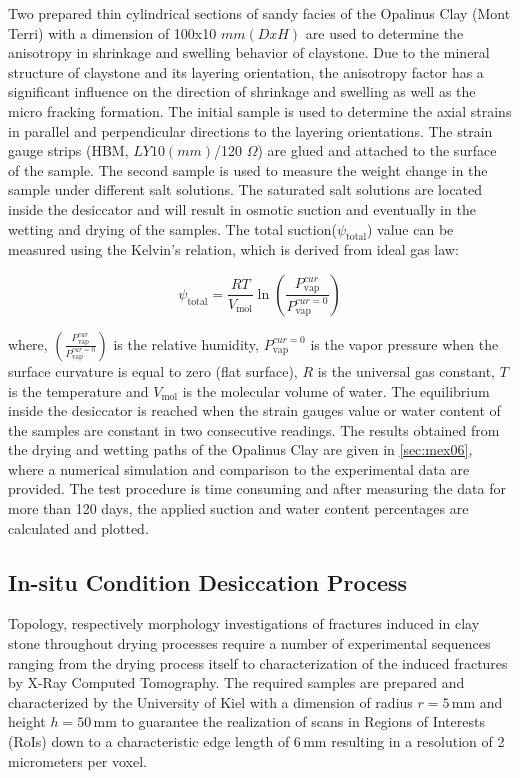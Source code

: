 Two prepared thin cylindrical sections of sandy facies of the Opalinus Clay (Mont Terri) with a dimension of 100x10 $mm (DxH)$ are used to determine the anisotropy in shrinkage and swelling behavior of claystone. Due to the mineral structure of claystone and its layering orientation, the anisotropy factor has a significant influence on the direction of shrinkage and swelling as well as the micro fracking formation. The initial sample is used to determine the axial strains in parallel and perpendicular directions to the layering orientations. The strain gauge strips (HBM, $LY 10 (mm)$/120 $\Omega$) are glued and attached to the surface of the sample. The second sample is used to measure the weight change in the sample under different salt solutions. The saturated salt solutions are located inside the desiccator and will result in osmotic suction and eventually in the wetting and drying of the samples. The total suction($\psi_\text{total}$) value can be measured using the Kelvin’s relation, which is derived from ideal gas law:

\begin{equation}
\label{eq:Total_Suction}
\psi_\text{total} = \frac{RT}{V_\text{mol}} \ln(\frac{P_\text{vap}^{cur}}{P_\text{vap}^{cur=0}})
\end{equation}

where, $(\frac{P_\text{vap}^{cur}}{P_\text{vap}^{cur=0}})$ is the relative humidity, $P_\text{vap}^{cur=0}$ is the vapor pressure when the surface curvature is equal to zero (flat surface), $R$ is the universal gas constant, $T$ is the temperature and $V_\text{mol}$ is the molecular volume of water. The equilibrium inside the desiccator is reached when the strain gauges value or water content of the samples are constant in two consecutive readings. The results obtained from the drying and wetting paths of the Opalinus Clay are given in \ref{sec:mex06}, where a numerical simulation and comparison to the experimental data are provided. The test procedure is time consuming and after measuring the data for more than 120 days, the applied suction and water content percentages are calculated and plotted. 

\subsection{In-situ Condition Desiccation Process}

Topology, respectively morphology investigations of fractures induced in clay stone throughout drying processes require a number of experimental sequences ranging from the drying process itself to characterization of the induced fractures by X-Ray Computed Tomography. The required samples are prepared and characterized by the University of Kiel with a dimension of radius $r=5 \, \text{mm}$ and height $h=50 \, \text{mm}$ to guarantee the realization of scans in Regions of Interests (RoIs) down to a characteristic edge length of $6 \, \text{mm}$ resulting in a resolution of 2 micrometers per voxel.

